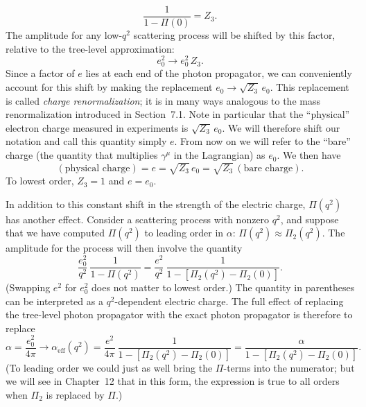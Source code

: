 \begin{equation}
  \frac{1}{1 - \Pi(0)} = Z_3 .
  \label{eq:7.75b}
\end{equation}
The amplitude for any low-$q^2$ scattering process will be shifted by this
factor, relative to the tree-level approximation:
\begin{equation}
  e_0^2 \to e_0^2\,Z_3 .
\end{equation}
Since a factor of $e$ lies at each end of the photon propagator, we can
conveniently account for this shift by making the replacement
$e_0 \to \sqrt{Z_3}\,e_0$.  This replacement is called \emph{charge
renormalization}; it is in many ways analogous to the mass renormalization
introduced in Section~7.1.  Note in particular that the ``physical'' electron
charge measured in experiments is $\sqrt{Z_3}\,e_0$.  We will therefore shift
our notation and call this quantity simply $e$.  From now on we will refer to
the ``bare'' charge (the quantity that multiplies $\gamma^\mu$ in the
Lagrangian) as $e_0$.  We then have
\begin{equation}
  (\text{physical charge}) = e = \sqrt{Z_3}\,e_0 = \sqrt{Z_3}\,
    (\text{bare charge}) .
  \label{eq:7.76}
\end{equation}
To lowest order, $Z_3 = 1$ and $e = e_0$.

In addition to this constant shift in the strength of the electric charge,
$\Pi(q^2)$ has another effect.  Consider a scattering process with nonzero
$q^2$, and suppose that we have computed $\Pi(q^2)$ to leading order in
$\alpha$: $\Pi(q^2) \approx \Pi_2(q^2)$.  The amplitude for the process will
then involve the quantity
\begin{equation}
  \frac{e_0^2}{q^2}\ \frac{1}{1-\Pi(q^2)} = \frac{e^2}{q^2}\
    \frac{1}{1 - [\Pi_2(q^2) - \Pi_2(0)]} .
\end{equation}
(Swapping $e^2$ for $e_0^2$ does not matter to lowest order.)  The quantity in
parentheses can be interpreted as a $q^2$-dependent electric charge.  The
full effect of replacing the tree-level photon propagator with the exact
photon propagator is therefore to replace
\begin{equation}
  \alpha = \frac{e_0^2}{4\pi}
    \to \alpha_{\mathrm{eff}}(q^2) = \frac{e^2}{4\pi}\
      \frac{1}{1 - [\Pi_2(q^2)-\Pi_2(0)]}
    = \frac{\alpha}{1 - [\Pi_2(q^2)-\Pi_2(0)]} .
  \label{eq:7.77}
\end{equation}
(To leading order we could just as well bring the $\Pi$-terms into the
numerator; but we will see in Chapter~12 that in this form, the expression is
true to all orders when $\Pi_2$ is replaced by $\Pi$.)

